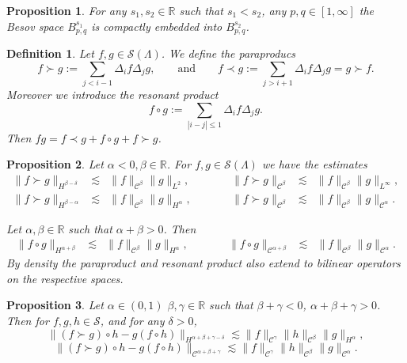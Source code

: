 \documentclass[11pt]{article}
\newcommand{\assign}{:=}
\newtheorem{definition}{Definition}
\newtheorem{proposition}{Proposition}
{\theorembodyfont{\rmfamily}\newtheorem{remark}{Remark}}
\newcommand{\VV}{\mathscr{C}}
\newcommand{\CS}{\mathscr{S}}
\begin{document}
\begin{proposition}
  \label{compactembedding}For any $s_1, s_2 \in \mathbb{R}$ such that $s_1 <
  s_2$, any $p, q \in [1, \infty]$ the Besov space $B^{s_1}_{p, q}$ is
  compactly embedded into $B^{s_2}_{p, q}$.
\end{proposition}

\begin{definition}
  Let $f, g \in \mathcal{\CS} (\Lambda)$. We define the paraproducs
  \[ f \succ g \assign \sum_{j < i - 1} \Delta_i f \Delta_j g, \qquad
     \text{and} \qquad f \prec g \assign \sum_{j > i + 1} \Delta_i f \Delta_j
     g = g \succ f. \]
  Moreover we introduce the resonant product
  \[ f \circ g \assign \sum_{| i - j | \leqslant 1} \Delta_i f \Delta_j g. \]
  Then $fg = f \prec g + f \circ g + f \succ g$.
\end{definition}

\begin{proposition}
  \label{paraproductestimate}Let $\alpha < 0, \beta \in \mathbb{R}$. For $f, g
  \in \CS (\Lambda)$ we have the estimates
  \[ \begin{array}{lllllll}
       \| f \succ g \|_{H^{\beta - \delta}} & \lesssim & \| f \|_{\VV^{\beta}}
       \| g \|_{L^2}, &  & \| f \succ g \|_{\VV^{\beta}} & \lesssim & \| f
       \|_{\VV^{\beta}} \| g \|_{L^{\infty}},\\
       \| f \succ g \|_{H^{\beta - \alpha}} & \lesssim & \| f \|_{\VV^{\beta}}
       \| g \|_{H^{\alpha}}, & \qquad & \| f \succ g \|_{\VV^{\beta}} &
       \lesssim & \| f \|_{\VV^{\beta}} \| g \|_{\VV^{\alpha}} .
     \end{array} \]
  
  
  Let $\alpha, \beta \in \mathbb{R}$ such that $\alpha + \beta > 0$. Then
  \[ \begin{array}{lllllll}
       \| f \circ g \|_{H^{\alpha + \beta}} & \lesssim & \| f \|_{\VV^{\beta}}
       \| g \|_{H^{\alpha}}, & \qquad & \| f \circ g \|_{\VV^{\alpha + \beta}}
       & \lesssim & \| f \|_{\VV^{\beta}} \| g \|_{\VV^{\alpha}} .
     \end{array} \]
  By density the paraproduct and resonant product also extend to bilinear
  operators on the respective spaces. 
\end{proposition}

\begin{proposition}
  \label{commutatorestimate}Let $\alpha \in (0, 1)$ $\beta, \gamma \in
  \mathbb{R}$ such that $\beta + \gamma < 0$, $\alpha + \beta + \gamma > 0$.
  Then for $f, g, h \in \CS$, and for any $\delta > 0$,
  \[ \| (f \succ g) \circ h - g (f \circ h) \|_{H^{\alpha + \beta + \gamma -
     \delta}} \lesssim \| f \|_{\VV^{\gamma}} \| h \|_{\VV^{\beta}} \| g
     \|_{H^{\alpha}}, \]
  \[ \| (f \succ g) \circ h - g (f \circ h) \|_{\VV^{\alpha + \beta + \gamma}}
     \lesssim \| f \|_{\VV^{\gamma}} \| h \|_{\VV^{\beta}} \| g
     \|_{\VV^{\alpha}} . \]
\end{proposition}
\end{document}
